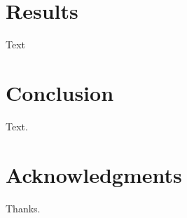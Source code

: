 \section{Results}
Text

\section{Conclusion}
Text.

\section*{Acknowledgments}
Thanks. 




\renewcommand{\thechapter}{\Roman{chapter}}